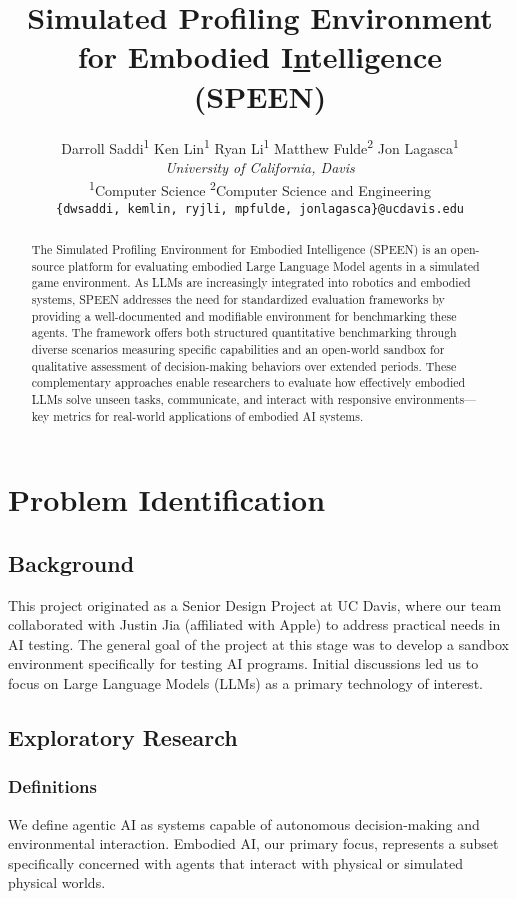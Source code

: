 \documentclass{article}
\title{Simulated Profiling Environment for Embodied I\underline{n}telligence (SPEEN)}
\author{%
    Darroll Saddi\textsuperscript{1} \quad
        Ken Lin\textsuperscript{1} \quad
        Ryan Li\textsuperscript{1} \quad
        Matthew Fulde\textsuperscript{2} \quad
        Jon Lagasca\textsuperscript{1} \vspace{0.75em} \\
        \large{\textit{University of California, Davis}} \\
        \vspace{0.5em}
        \textsuperscript{1}Computer Science \quad
        \textsuperscript{2}Computer Science and Engineering \\
        \texttt{\{dwsaddi, kemlin, ryjli, mpfulde, jonlagasca\}@ucdavis.edu}
    }
\begin{document}
\maketitle

\begin{abstract}
    The Simulated Profiling Environment for Embodied Intelligence (SPEEN) is an open-source platform for evaluating embodied Large Language Model agents in a simulated game environment.
    As LLMs are increasingly integrated into robotics and embodied systems, SPEEN addresses the need for standardized evaluation frameworks by providing a well-documented and modifiable environment for benchmarking these agents.
    The framework offers both structured quantitative benchmarking through diverse scenarios measuring specific capabilities and an open-world sandbox for qualitative assessment of decision-making behaviors over extended periods.
    These complementary approaches enable researchers to evaluate how effectively embodied LLMs solve unseen tasks, communicate, and interact with responsive environments---key metrics for real-world applications of embodied AI systems.
\end{abstract}

\section{Problem Identification}

\subsection{Background}
This project originated as a Senior Design Project at UC Davis, where our team collaborated with Justin Jia (affiliated with Apple) to address practical needs in AI testing.
The general goal of the project at this stage was to develop a sandbox environment specifically for testing AI programs.
Initial discussions led us to focus on Large Language Models (LLMs) as a primary technology of interest.

\subsection{Exploratory Research}

\subsubsection{Definitions}
We define agentic AI as systems capable of autonomous decision-making and environmental interaction.
Embodied AI, our primary focus, represents a subset specifically concerned with agents that interact with physical or simulated physical worlds.
\end{document}
